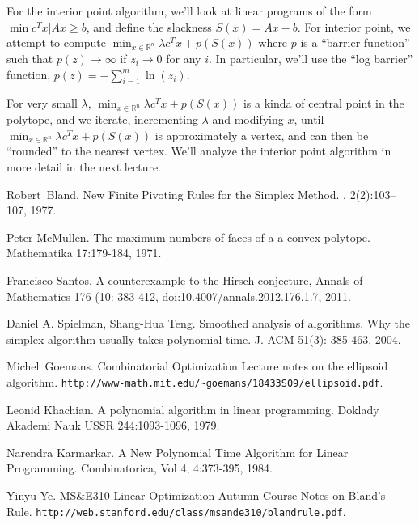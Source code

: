 \documentclass[11pt]{article}
\begin{document}
For the interior point algorithm, we'll look at linear programs of
the form $\min c^{T}x|Ax\geq b$, and define the slackness $S(x)=Ax-b$.
For interior point, we attempt to compute $\min_{x\in\mathbb{R}^{n}}\lambda c^{T}x+p(S(x))$
where $p$ is a ``barrier function'' such that $p(z)\rightarrow\infty$
if $z_{i}\rightarrow0$ for any $i$. In particular, we'll use the
``log barrier'' function, $p(z)=-\sum_{i=1}^{m}\ln(z_{i})$.

For very small $\lambda$, $\min_{x\in\mathbb{R}^{n}}\lambda c^{T}x+p(S(x))$
is a kinda of central point in the polytope, and we iterate, incrementing
$\lambda$ and modifying $x$, until $\min_{x\in\mathbb{R}^{n}}\lambda c^{T}x+p(S(x))$
is approximately a vertex, and can then be ``rounded'' to the nearest
vertex. We'll analyze the interior point algorithm in more detail
in the next lecture.
\begin{thebibliography}{1}
Robert~Bland.
\newblock New Finite Pivoting Rules for the Simplex Method.
, 2(2):103--107, 1977.

Peter McMullen. The maximum numbers of faces
of a a convex polytope. Mathematika 17:179-184, 1971.

Francisco Santos. A counterexample to the Hirsch
conjecture, Annals of Mathematics 176 (10: 383-412, doi:10.4007/annals.2012.176.1.7,
2011.

Daniel A. Spielman, Shang-Hua Teng. Smoothed
analysis of algorithms. Why the simplex algorithm usually takes polynomial
time. J. ACM 51(3): 385-463, 2004.

Michel~Goemans.
\newblock Combinatorial Optimization Lecture notes on the ellipsoid algorithm.
\texttt{http://www-math.mit.edu/{\textasciitilde}goemans/18433S09/ellipsoid.pdf}.

Leonid Khachian. A polynomial algorithm in linear
programming. Doklady Akademi Nauk USSR 244:1093-1096, 1979.

Narendra Karmarkar. A New Polynomial Time Algorithm
for Linear Programming. Combinatorica, Vol 4, 4:373-395, 1984.

Yinyu Ye.
\newblock MS{\&}E310 Linear Optimization Autumn Course Notes on Bland's Rule.
\newblock \texttt{http://web.stanford.edu/class/msande310/blandrule.pdf}.
\end{thebibliography}
\end{document}
